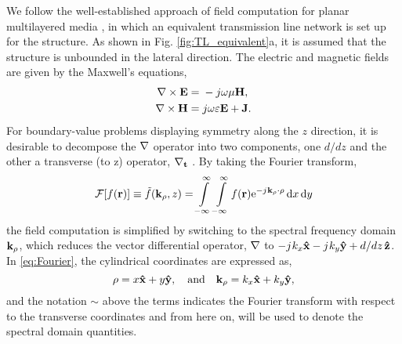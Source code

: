 \documentclass[12pt]{article}
\begin{document}
We follow the well-established approach of field computation for planar multilayered media \cite{michalski1997multilayered, michalski2005}, in which an equivalent transmission line network is set up for the structure. As shown in Fig. \ref{fig:TL_equivalent}a, it is assumed that the structure is unbounded in the lateral direction. The electric and magnetic fields are given by the Maxwell's equations,
\begin{subequations}
  \begin{align}
    \nabla\times{\mathbf{E}} ={}& -j \omega \mu \mathbf{H},
    \label{eq:E}\\
    \nabla\times{\mathbf{H}} ={}& j \omega \varepsilon \mathbf{E} + \mathbf{J}.
    \label{eq:H}
  \end{align}
  \label{eq:MaxE}%
\end{subequations}
%
For boundary-value problems displaying symmetry along the $z$ direction, it is desirable to decompose the $\mathbf{\nabla}$ operator into two components, one $d/dz$ and the other a transverse (to z) operator, $\mathbf{\nabla_t}$ \cite[p. 64]{felsen1994}. By taking the Fourier transform,
%
\begin{equation}
    \mathcal{F}[f(\mathbf{r})] \equiv \tilde{f}(\mathbf{k_{\rho}},z) = \int\limits_{-\infty}^\infty \int\limits_{-\infty}^\infty
    f(\mathbf{r}) \mathrm{e}^{-j\mkern1mu \mathbf{k_{\rho}} \cdot \mathbf{\rho}} \mathop{}\!\mathrm{d}{x} \mathop{}\!\mathrm{d}{y}
    \label{eq:Fourier}
\end{equation}
%
the field computation is simplified by switching to the spectral frequency domain $\mathbf{k_{\rho}}$, which reduces the vector differential operator, $\mathbf{\nabla}$ to $-j\mkern1mu k_x \mathbf{\hat{x}} - j\mkern1mu k_y \mathbf{\hat{y}} + d/dz\, \mathbf{\hat{z}}$. In \eqref{eq:Fourier}, the cylindrical coordinates are expressed as,
%
\begin{equation}
  \mathbf{\rho} = x\mathbf{\hat{x}} + y\mathbf{\hat{y}}, \quad \text{and} \quad
  \mathbf{k_{\rho}} = k_x\mathbf{\hat{x}} + k_y\mathbf{\hat{y}},
\end{equation}
%
and the notation $\sim$ above the terms indicates the Fourier transform with respect to the transverse coordinates and from here on, will be used to denote the spectral domain quantities.
\end{document}
